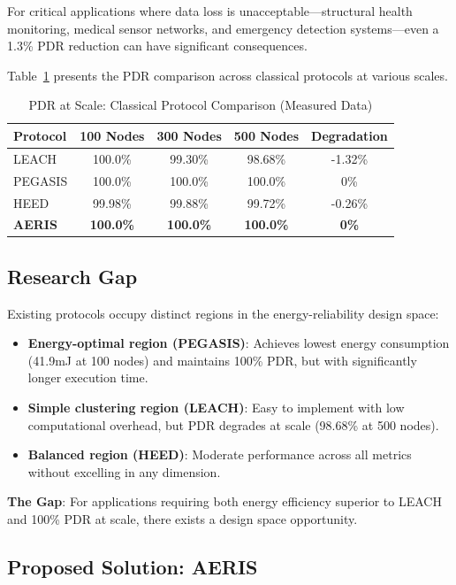 For critical applications where data loss is unacceptable---structural health
monitoring, medical sensor networks, and emergency detection systems---even
a 1.3\% PDR reduction can have significant consequences.

Table~\ref{tab:pdr_comparison} presents the PDR comparison across classical
protocols at various scales.

\begin{table}[htbp]
\centering
\caption{PDR at Scale: Classical Protocol Comparison (Measured Data)}
\label{tab:pdr_comparison}
\begin{tabular}{@{}lcccc@{}}
\toprule
Protocol & 100 Nodes & 300 Nodes & 500 Nodes & Degradation \\
\midrule
LEACH & 100.0\% & 99.30\% & 98.68\% & -1.32\% \\
PEGASIS & 100.0\% & 100.0\% & 100.0\% & 0\% \\
HEED & 99.98\% & 99.88\% & 99.72\% & -0.26\% \\
\textbf{AERIS} & \textbf{100.0\%} & \textbf{100.0\%} & \textbf{100.0\%} & \textbf{0\%} \\
\bottomrule
\end{tabular}
\end{table}

\subsection{Research Gap}

Existing protocols occupy distinct regions in the energy-reliability design space:

\begin{itemize}
    \item \textbf{Energy-optimal region (PEGASIS)}: Achieves lowest energy
    consumption (41.9mJ at 100 nodes) and maintains 100\% PDR, but with
    significantly longer execution time.
    \item \textbf{Simple clustering region (LEACH)}: Easy to implement
    with low computational overhead, but PDR degrades at scale (98.68\%
    at 500 nodes).
    \item \textbf{Balanced region (HEED)}: Moderate performance across all
    metrics without excelling in any dimension.
\end{itemize}

\textbf{The Gap}: For applications requiring both energy efficiency superior
to LEACH and 100\% PDR at scale, there exists a design space opportunity.

\subsection{Proposed Solution: AERIS}

